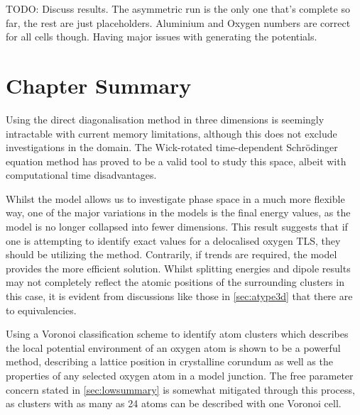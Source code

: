 TODO: Discuss results.
The asymmetric run is the only one that's complete so far, the rest are just placeholders.
Aluminium and Oxygen numbers are correct for all cells though.
Having major issues with generating the potentials.

\section{Chapter Summary}\label{sec:summary3d}

Using the direct diagonalisation method in three dimensions is seemingly intractable with current memory limitations, although this does not exclude investigations in the  domain.
The Wick-rotated time-dependent Schrödinger equation method has proved to be a valid tool to study this space, albeit with computational time disadvantages.

Whilst the  model allows us to investigate phase space in a much more flexible way, one of the major variations in the models is the final energy values, as the  model is no longer collapsed into fewer dimensions.
This result suggests that if one is attempting to identify exact values for a delocalised oxygen TLS, they should be utilizing the  method.
Contrarily, if trends are required, the  model provides the more efficient solution.
Whilst splitting energies and dipole results may not completely reflect the atomic positions of the surrounding clusters in this case, it is evident from discussions like those in \cref{sec:atype3d} that there are  to  equivalencies.

Using a Voronoi classification scheme to identify atom clusters which describes the local potential environment of an oxygen atom is shown to be a powerful method, describing a lattice position in crystalline corundum as well as the properties of any selected oxygen atom in a model junction.
The free parameter concern stated in \cref{sec:lowsummary} is somewhat mitigated through this process, as clusters with as many as 24 atoms can be described with one Voronoi cell.

